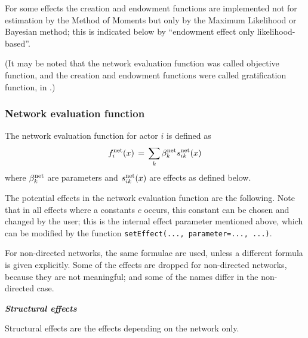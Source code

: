 \documentclass[a4paper,fleqn,11pt]{article}
\newcommand{\+}{\, + \,}
\begin{document}
For some effects
the creation and endowment functions are
implemented not for estimation by the Method of Moments
but only by the Maximum Likelihood or Bayesian method;
this is indicated below by ``endowment effect only likelihood-based''.

(It may be noted that the network evaluation function
was called objective function,
and the creation and endowment functions were called gratification function,
in \citet{Snijders01}.)

\subsubsection{Network evaluation function}
\label{S_f}

The network evaluation function for actor $i$ is defined as
\begin{equation}
f^{\rm net}_i(x) \, = \,
              \sum_k \beta^{\rm net}_k s^{\rm net}_{ik}(x)   \label{f_net}
\end{equation}
where $\beta^{\rm net}_k$ are parameters and $s^{\rm net}_{ik}(x)$
are effects as defined below.

The potential effects in the \hypertarget{T_objective}{network
evaluation function}
are the following. Note that in all
effects where a constants $c$ occurs, this constant can be chosen
and changed by the user;
this is the internal effect parameter mentioned above,
which can be modified by the function \texttt{setEffect(..., parameter=..., ...)}.

For non-directed networks, the same formulae are used,
unless a different formula is given explicitly.
Some of the effects are dropped for non-directed networks, because
they are not meaningful; and some of the names differ in the
non-directed case.
\medskip

\noindent
\textbf{\emph{Structural effects}}
\medskip

\noindent
Structural effects are the effects depending on the network only.
\end{document}
